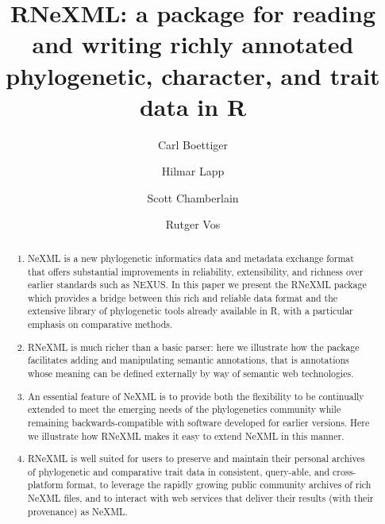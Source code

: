 \documentclass[author-year, review, 11pt]{components/elsarticle} %
\begin{document}
\begin{frontmatter}

  \title{RNeXML: a package for reading and writing richly annotated phylogenetic,
character, and trait data in R}
    \author[cstar]{Carl Boettiger}
    \author[NESCent]{Hilmar Lapp}
  
  
    \author[ropensci]{Scott Chamberlain}
  
  
    \author[NBC]{Rutger Vos}
  
  
      \address[cstar]{Center for Stock Assessment Research, Department of Applied Math and
Statistics, University of California, Mail Stop SOE-2, Santa Cruz, CA
95064, USA}    
    \address[NESCent]{National Evolutionary Synthesis Center, Durham, NC, USA}    
    \address[ropensci]{University of California, Berkeley, CA, USA}    
    \address[NBC]{Naturalis Biodiversity Center, Leiden, the Netherlands}    
  
  \begin{abstract}
  \begin{enumerate}
  \def\labelenumi{\arabic{enumi}.}
  \item
    NeXML is a new phylogenetic informatics data and metadata exchange
    format that offers substantial improvements in reliability,
    extensibility, and richness over earlier standards such as NEXUS. In
    this paper we present the RNeXML package which provides a bridge
    between this rich and reliable data format and the extensive library
    of phylogenetic tools already available in R, with a particular
    emphasis on comparative methods.
  \item
    RNeXML is much richer than a basic parser: here we illustrate how the
    package facilitates adding and manipulating semantic annotations, that
    is annotations whose meaning can be defined externally by way of
    semantic web technologies.
  \item
    An essential feature of NeXML is to provide both the flexibility to be
    continually extended to meet the emerging needs of the phylogenetics
    community while remaining backwards-compatible with software developed
    for earlier versions. Here we illustrate how RNeXML makes it easy to
    extend NeXML in this manner.
  \item
    RNeXML is well suited for users to preserve and maintain their
    personal archives of phylogenetic and comparative trait data in
    consistent, query-able, and cross-platform format, to leverage the
    rapidly growing public community archives of rich NeXML files, and to
    interact with web services that deliver their results (with their
    provenance) as NeXML.
  \end{enumerate}
  \end{abstract}
  
 \end{frontmatter}
\end{document}

